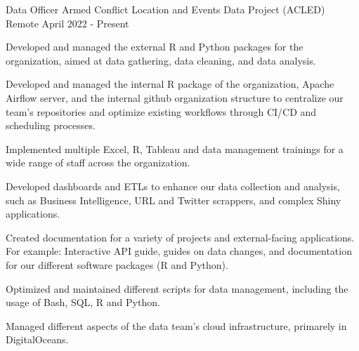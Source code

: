 

\begin{cventries}

  \cventry
    {Data Officer} %
    {Armed Conflict Location and Events Data Project (ACLED)} %
    {Remote} %
    {April 2022 - Present} %
    {
      \begin{cvitems} %
        \item {Developed and managed the external R and Python packages for the organization, aimed at data gathering, data cleaning, and data analysis.}
        \item {Developed and managed the internal R package of the organization, Apache Airflow server, and the internal github organization structure to centralize our team's repositories and optimize existing workflows through CI/CD and scheduling processes.}
        \item {Implemented multiple Excel, R, Tableau and data management trainings for a wide range of staff across the organization.}
        \item {Developed dashboards and ETLs to enhance our data collection and analysis, such as Business Intelligence, URL and Twitter scrappers, and complex Shiny applications.}
        \item {Created documentation for a variety of projects and external-facing applications. For example: Interactive API guide, guides on data changes, and documentation for our different software packages (R and Python).}
        \item {Optimized and maintained different scripts for data management, including the usage of Bash, SQL, R and Python.}
        \item {Managed different aspects of the data team's cloud infrastructure, primarely in DigitalOceans.}
      \end{cvitems}
    }



\end{cventries}
